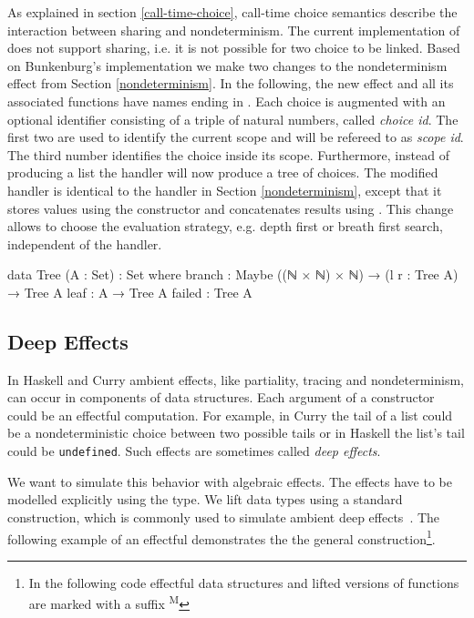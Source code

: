 As explained in section \ref{call-time-choice}, call-time choice semantics
describe the interaction between sharing and nondeterminism.
The current implementation of  does not support sharing,
i.e. it is not possible for two choice to be linked.
Based on Bunkenburg's implementation we make two changes to the
nondeterminism effect from Section \ref{nondeterminism}.
In the following, the new effect and all its associated functions have names
ending in .
Each choice is augmented with an optional identifier consisting of a triple of
natural numbers, called \textit{choice id}.
The first two are used to identify the current scope and will be refereed to as
\textit{scope id}.
The third number identifies the choice inside its scope.
Furthermore, instead of producing a list the handler will now produce a tree of
choices.
The modified handler is identical to the handler in Section
\ref{nondeterminism}, except that it stores values using the
 constructor and concatenates results using
.
This change allows to choose the evaluation strategy, e.g. depth first or breath
first search, independent of the handler.

\begin{code}
data Tree (A : Set) : Set where
  branch  : Maybe ((ℕ × ℕ) × ℕ) → (l r : Tree A) → Tree A
  leaf    : A → Tree A
  failed  : Tree A
\end{code}

\subsection{Deep Effects}
\label{first-order:deep-effects}

In Haskell and Curry ambient effects, like partiality, tracing and
nondeterminism, can occur in components of data structures.
Each argument of a constructor could be an effectful computation.
For example, in Curry the tail of a list could be a nondeterministic choice
between two possible tails or in Haskell the list's tail could be
\texttt{undefined}.
Such effects are sometimes called \textit{deep effects}.

We want to simulate this behavior with algebraic effects.
The effects have to be modelled explicitly using the  type.
We lift data types using a standard construction, which is commonly used
to simulate ambient deep
effects~\cite{DBLP:conf/haskell/AbelBBHN05, DBLP:journals/programming/DylusCT19,
DBLP:conf/haskell/ChristiansenDB19}.
The following example of an effectful  demonstrates the
the general construction\footnote{In the following code effectful data
  structures and lifted versions of functions are marked with a suffix
  \textsuperscript{M}}.

